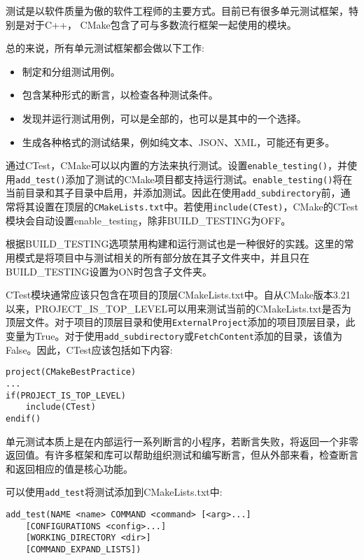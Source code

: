 测试是以软件质量为傲的软件工程师的主要方式。目前已有很多单元测试框架，特别是对于C++， CMake包含了可与多数流行框架一起使用的模块。

总的来说，所有单元测试框架都会做以下工作:

\begin{itemize}
\item 
制定和分组测试用例。

\item 
包含某种形式的断言，以检查各种测试条件。

\item 
发现并运行测试用例，可以是全部的，也可以是其中的一个选择。

\item 
生成各种格式的测试结果，例如纯文本、JSON、XML，可能还有更多。
\end{itemize}

通过CTest，CMake可以以内置的方法来执行测试。设置\texttt{enable\_testing()}，并使用\texttt{add\_test()}添加了测试的CMake项目都支持运行测试。\texttt{enable\_testing()}将在当前目录和其子目录中启用，并添加测试。因此在使用\texttt{add\_subdirectory}前，通常将其设置在顶层的\texttt{CMakeLists.txt}中。若使用\texttt{include(CTest)}，CMake的CTest模块会自动设置enable\_testing，除非BUILD\_TESTING为OFF。

根据BUILD\_TESTING选项禁用构建和运行测试也是一种很好的实践。这里的常用模式是将项目中与测试相关的所有部分放在其子文件夹中，并且只在BUILD\_TESTING设置为ON时包含子文件夹。

CTest模块通常应该只包含在项目的顶层CMakeLists.txt中。自从CMake版本3.21以来，PROJECT\_IS\_TOP\_LEVEL可以用来测试当前的CMakeLists.txt是否为顶层文件。对于项目的顶层目录和使用\texttt{ExternalProject}添加的项目顶层目录，此变量为True。对于使用\texttt{add\_subdirectory}或\texttt{FetchContent}添加的目录，该值为False。因此，CTest应该包括如下内容:

\begin{lstlisting}[style=styleCMake]
project(CMakeBestPractice)
...
if(PROJECT_IS_TOP_LEVEL)
	include(CTest)
endif()
\end{lstlisting}

单元测试本质上是在内部运行一系列断言的小程序，若断言失败，将返回一个非零返回值。有许多框架和库可以帮助组织测试和编写断言，但从外部来看，检查断言和返回相应的值是核心功能。

可以使用\texttt{add\_test}将测试添加到CMakeLists.txt中:

\begin{lstlisting}[style=styleCMake]
add_test(NAME <name> COMMAND <command> [<arg>...]
	[CONFIGURATIONS <config>...]
	[WORKING_DIRECTORY <dir>]
	[COMMAND_EXPAND_LISTS])
\end{lstlisting}

